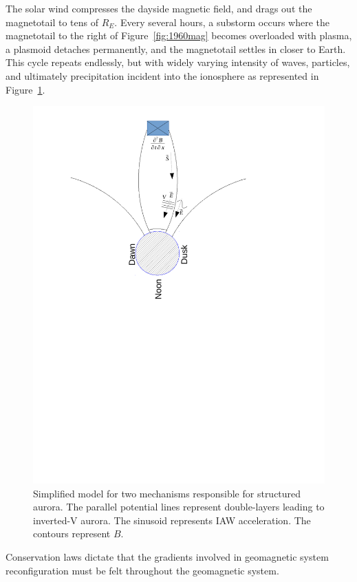 The solar wind compresses the dayside magnetic field, and drags out the magnetotail to tens of $R_E$.
Every several hours, a substorm occurs where the magnetotail to the right of Figure~\ref{fig:1960mag} becomes overloaded with plasma, a plasmoid detaches permanently, and the magnetotail settles in closer to Earth.
This cycle repeats endlessly, but with widely varying intensity of waves, particles, and ultimately precipitation incident into the ionosphere as represented in Figure~\ref{fig:magcirc}.
\begin{figure}\centering
	\includegraphics[width=\linewidth,trim=50 370 150 40,clip]{gfx/magcirc}
	\caption{Simplified model for two mechanisms responsible for structured aurora. 
		The parallel potential lines represent double-layers leading to inverted-V aurora. 
		The sinusoid represents IAW acceleration. 
		The contours represent $B$.}
	\label{fig:magcirc}
\end{figure}
Conservation laws dictate that the gradients involved in geomagnetic system reconfiguration must be felt throughout the geomagnetic system.
